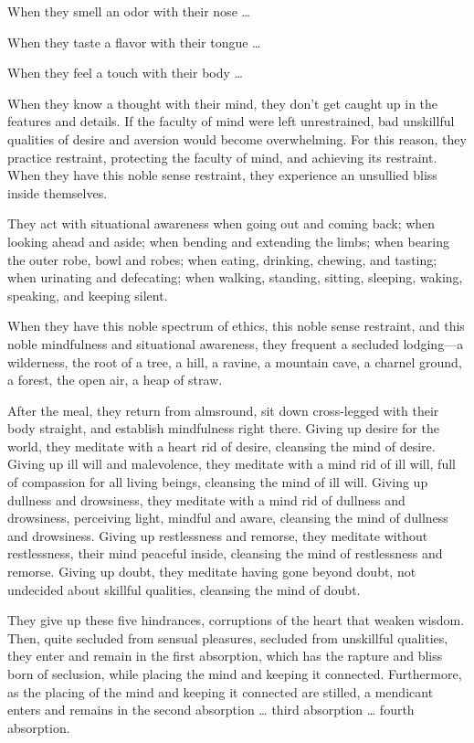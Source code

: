 \documentclass[12pt,openany]{book}%
\begin{document}
When they smell an odor with their nose … 

When they taste a flavor with their tongue … 

When they feel a touch with their body … 

When they know a thought with their mind, they don’t get caught up in the features and details. If the faculty of mind were left unrestrained, bad unskillful qualities of desire and aversion would become overwhelming. For this reason, they practice restraint, protecting the faculty of mind, and achieving its restraint. When they have this noble sense restraint, they experience an unsullied bliss inside themselves. 

They act with situational awareness when going out and coming back; when looking ahead and aside; when bending and extending the limbs; when bearing the outer robe, bowl and robes; when eating, drinking, chewing, and tasting; when urinating and defecating; when walking, standing, sitting, sleeping, waking, speaking, and keeping silent. 

When they have this noble spectrum of ethics, this noble sense restraint, and this noble mindfulness and situational awareness, they frequent a secluded lodging—a wilderness, the root of a tree, a hill, a ravine, a mountain cave, a charnel ground, a forest, the open air, a heap of straw. 

After the meal, they return from almsround, sit down cross-legged with their body straight, and establish mindfulness right there. Giving up desire for the world, they meditate with a heart rid of desire, cleansing the mind of desire. Giving up ill will and malevolence, they meditate with a mind rid of ill will, full of compassion for all living beings, cleansing the mind of ill will. Giving up dullness and drowsiness, they meditate with a mind rid of dullness and drowsiness, perceiving light, mindful and aware, cleansing the mind of dullness and drowsiness. Giving up restlessness and remorse, they meditate without restlessness, their mind peaceful inside, cleansing the mind of restlessness and remorse. Giving up doubt, they meditate having gone beyond doubt, not undecided about skillful qualities, cleansing the mind of doubt. 

They give up these five hindrances, corruptions of the heart that weaken wisdom. Then, quite secluded from sensual pleasures, secluded from unskillful qualities, they enter and remain in the first absorption, which has the rapture and bliss born of seclusion, while placing the mind and keeping it connected. Furthermore, as the placing of the mind and keeping it connected are stilled, a mendicant enters and remains in the second absorption … third absorption … fourth absorption. 
\end{document}
